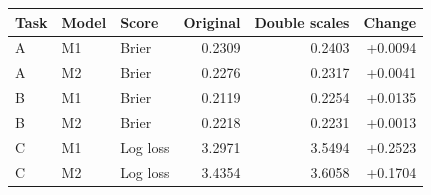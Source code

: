 \begin{tabular}{lllrrr}
\toprule
Task & Model & Score & Original & Double scales & Change \\
\midrule
A & M1 & Brier & 0.2309 & 0.2403 & +0.0094 \\
A & M2 & Brier & 0.2276 & 0.2317 & +0.0041 \\
B & M1 & Brier & 0.2119 & 0.2254 & +0.0135 \\
B & M2 & Brier & 0.2218 & 0.2231 & +0.0013 \\
C & M1 & Log loss & 3.2971 & 3.5494 & +0.2523 \\
C & M2 & Log loss & 3.4354 & 3.6058 & +0.1704 \\
\bottomrule
\end{tabular}
